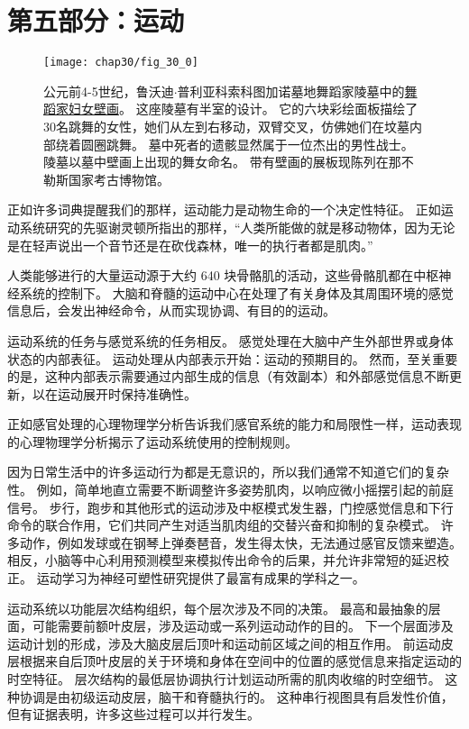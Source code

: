 \chapter*{第五部分：运动}

\begin{figure}[htbp]
	\centering
	\texttt{[image: chap30/fig\_30\_0]}
	\caption{公元前4-5世纪，鲁沃迪$\cdot$普利亚科索科图加诺墓地舞蹈家陵墓中的\href{https://en.wikipedia.org/wiki/Tomb_of_the_Dancers}{舞蹈家妇女壁画}。
		这座陵墓有半室的设计。
		它的六块彩绘面板描绘了30名跳舞的女性，她们从左到右移动，双臂交叉，仿佛她们在坟墓内部绕着圆圈跳舞。
		墓中死者的遗骸显然属于一位杰出的男性战士。
		陵墓以墓中壁画上出现的舞女命名。
		带有壁画的展板现陈列在那不勒斯国家考古博物馆。 }
	\label{fig:30_0}
\end{figure}


正如许多词典提醒我们的那样，运动能力是动物生命的一个决定性特征。
正如运动系统研究的先驱谢灵顿所指出的那样，“人类所能做的就是移动物体，因为无论是在轻声说出一个音节还是在砍伐森林，唯一的执行者都是肌肉。”


人类能够进行的大量运动源于大约 640 块骨骼肌的活动，这些骨骼肌都在中枢神经系统的控制下。
大脑和脊髓的运动中心在处理了有关身体及其周围环境的感觉信息后，会发出神经命令，从而实现协调、有目的的运动。


运动系统的任务与感觉系统的任务相反。
感觉处理在大脑中产生外部世界或身体状态的内部表征。
运动处理从内部表示开始：运动的预期目的。
然而，至关重要的是，这种内部表示需要通过内部生成的信息（有效副本）和外部感觉信息不断更新，以在运动展开时保持准确性。


正如感官处理的心理物理学分析告诉我们感官系统的能力和局限性一样，运动表现的心理物理学分析揭示了运动系统使用的控制规则。


因为日常生活中的许多运动行为都是无意识的，所以我们通常不知道它们的复杂性。
例如，简单地直立需要不断调整许多姿势肌肉，以响应微小摇摆引起的前庭信号。
步行，跑步和其他形式的运动涉及中枢模式发生器，门控感觉信息和下行命令的联合作用，它们共同产生对适当肌肉组的交替兴奋和抑制的复杂模式。
许多动作，例如发球或在钢琴上弹奏琶音，发生得太快，无法通过感官反馈来塑造。
相反，小脑等中心利用预测模型来模拟传出命令的后果，并允许非常短的延迟校正。
运动学习为神经可塑性研究提供了最富有成果的学科之一。


运动系统以功能层次结构组织，每个层次涉及不同的决策。
最高和最抽象的层面，可能需要前额叶皮层，涉及运动或一系列运动动作的目的。
下一个层面涉及运动计划的形成，涉及大脑皮层后顶叶和运动前区域之间的相互作用。
前运动皮层根据来自后顶叶皮层的关于环境和身体在空间中的位置的感觉信息来指定运动的时空特征。
层次结构的最低层协调执行计划运动所需的肌肉收缩的时空细节。
这种协调是由初级运动皮层，脑干和脊髓执行的。
这种串行视图具有启发性价值，但有证据表明，许多这些过程可以并行发生。


